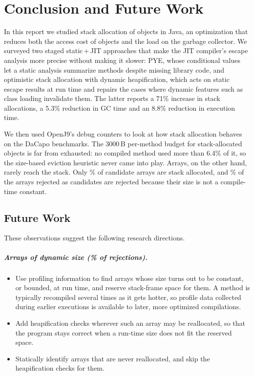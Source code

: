\chapter{Conclusion and Future Work}
\label{ch:conclusion}

In this report we studied stack allocation of objects in Java, an optimization that reduces both
the access cost of objects and the load on the garbage collector. We surveyed two staged
static\,+\,JIT approaches that make the JIT compiler's escape analysis more precise without
making it slower: PYE, whose conditional values let a static analysis summarize methods despite
missing library code, and optimistic stack allocation with dynamic heapification, which acts on
static escape results at run time and repairs the cases where dynamic features such as class
loading invalidate them. The latter reports a 71\% increase in stack allocations, a 5.3\%
reduction in GC time and an 8.8\% reduction in execution time.

We then used OpenJ9's debug counters to look at how stack allocation behaves on the DaCapo
benchmarks. The 3000\,B per-method budget for stack-allocated objects is far from exhausted: no
compiled method used more than 6.4\% of it, so the size-based eviction heuristic never came into
play. Arrays, on the other hand, rarely reach the stack. Only \StackRateOfCand\% of candidate
arrays are stack allocated, and \TopReasonShare\% of the arrays rejected as candidates are
rejected because their size is not a compile-time constant.

\section{Future Work}

These observations suggest the following research directions.

\paragraph{Arrays of dynamic size (\TopReasonShare\% of rejections).}
\begin{itemize}
  \item Use profiling information to find arrays whose size turns out to be constant, or bounded,
        at run time, and reserve stack-frame space for them. A method is typically recompiled
        several times as it gets hotter, so profile data collected during earlier executions is
        available to later, more optimized compilations.
  \item Add heapification checks wherever such an array may be reallocated, so that the program
        stays correct when a run-time size does not fit the reserved space.
  \item Statically identify arrays that are never reallocated, and skip the heapification checks
        for them.
\end{itemize}

